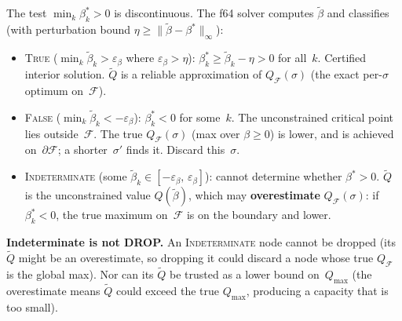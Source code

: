 \begin{remark}%
\label{rem:trinary-beta}
The test $\min_k \beta^*_k > 0$ is discontinuous.
The f64 solver computes $\tilde\beta$ and classifies
(with perturbation bound $\eta \geq \|\tilde\beta - \beta^*\|_\infty$):
\begin{itemize}
  \item \textsc{True}
    ($\min_k \tilde\beta_k > \varepsilon_\beta$
    where $\varepsilon_\beta > \eta$):
    $\beta^*_k \geq \tilde\beta_k - \eta > 0$ for all~$k$.
    Certified interior solution.
    $\tilde Q$ is a reliable approximation of $Q_{\mathcal{F}}(\sigma)$
    (the exact per-$\sigma$ optimum on~$\mathcal{F}$).
  \item \textsc{False}
    ($\min_k \tilde\beta_k < -\varepsilon_\beta$):
    $\beta^*_k < 0$ for some~$k$.
    The unconstrained critical point lies outside~$\mathcal{F}$.
    The true $Q_{\mathcal{F}}(\sigma)$ (max over $\beta \geq 0$)
    is lower, and is achieved on~$\partial\mathcal{F}$;
    a shorter~$\sigma'$ finds it.
    Discard this~$\sigma$.
  \item \textsc{Indeterminate}
    (some $\tilde\beta_k \in [-\varepsilon_\beta,\, \varepsilon_\beta]$):
    cannot determine whether $\beta^* > 0$.
    $\tilde Q$ is the unconstrained value $Q(\tilde\beta)$, which
    may \textbf{overestimate} $Q_{\mathcal{F}}(\sigma)$:
    if $\beta^*_k < 0$, the true maximum on~$\mathcal{F}$ is on the
    boundary and lower.
\end{itemize}

\medskip\noindent
\textbf{Indeterminate is not DROP.}
An \textsc{Indeterminate} node cannot be dropped (its
$\tilde Q$ might be an overestimate, so dropping it could
discard a node whose true $Q_{\mathcal{F}}$ is the global max).
Nor can its $\tilde Q$ be trusted as a lower bound on~$Q_{\max}$
(the overestimate means $\tilde Q$ could exceed the true
$Q_{\max}$, producing a capacity that is too small).


\end{remark}
